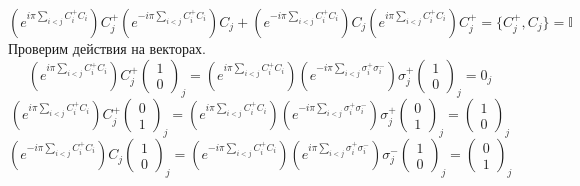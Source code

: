 \documentclass[12pt]{article}
\theoremstyle{definition}
\begin{document}
\begin{enumerate}
    \begin{equation*}
        \left(e^{i\pi\sum\limits_{i<j}C^+_iC_i}\right)C_j^+\left(e^{-i\pi\sum\limits_{i<j}C^+_iC_i}\right)C_j+\left(e^{-i\pi\sum\limits_{i<j}C^+_iC_i}\right)C_j\left(e^{i\pi\sum\limits_{i<j}C^+_iC_i}\right)C_j^+=\{C_j^+,C_j\}=\mathbb{I}
    \end{equation*}
    Проверим действия на векторах.
    \begin{equation}
        \left(e^{i\pi\sum\limits_{i<j}C^+_iC_i}\right)C_j^+\begin{pmatrix}
            1\\0
        \end{pmatrix}_j=\left(e^{i\pi\sum\limits_{i<j}C^+_iC_i}\right)\left(e^{-i\pi\sum\limits_{i<j}\sigma^+_i\sigma^-_i}\right)\sigma^+_j\begin{pmatrix}
            1\\0
        \end{pmatrix}_j=0_j
    \end{equation}
    \begin{equation}
        \left(e^{i\pi\sum\limits_{i<j}C^+_iC_i}\right)C_j^+\begin{pmatrix}
            0\\1
        \end{pmatrix}_j=\left(e^{i\pi\sum\limits_{i<j}C^+_iC_i}\right)\left(e^{-i\pi\sum\limits_{i<j}\sigma^+_i\sigma^-_i}\right)\sigma^+_j\begin{pmatrix}
            0\\1
        \end{pmatrix}_j=\begin{pmatrix}
            1\\0
        \end{pmatrix}_j
    \end{equation}
    \begin{equation}
        \left(e^{-i\pi\sum\limits_{i<j}C^+_iC_i}\right)C_j\begin{pmatrix}
            1\\0
        \end{pmatrix}_j=\left(e^{-i\pi\sum\limits_{i<j}C^+_iC_i}\right)\left(e^{i\pi\sum\limits_{i<j}\sigma^+_i\sigma^-_i}\right)\sigma^-_j\begin{pmatrix}
            1\\0
        \end{pmatrix}_j=\begin{pmatrix}
            0\\1
        \end{pmatrix}_j

\end{equation}
\end{enumerate}
\end{document}
